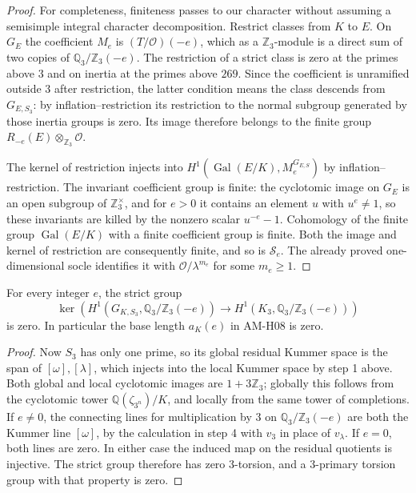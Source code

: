 \begin{proof}
For completeness, finiteness passes to our character without
assuming a semisimple integral character decomposition.  Restrict
classes from $K$ to $E$.  On $G_E$ the coefficient $M_e$ is
$(T/\mathcal O)(-e)$, which as a $\mathbb Z_3$-module is a direct
sum of two copies of $\mathbb Q_3/\mathbb Z_3(-e)$.
The restriction of a strict class is zero at the primes above $3$
and on inertia at the primes above $269$.  Since the coefficient
is unramified outside $3$ after restriction, the latter condition
means the class descends from $G_{E,S_3}$: by inflation--restriction
its restriction to the normal subgroup generated by those inertia
groups is zero.  Its image therefore belongs to the finite group
$R_{-e}(E)\otimes_{\mathbb Z_3}\mathcal O$.

The kernel of restriction injects into
$H^1(\operatorname{Gal}(E/K),M_e^{G_{E,S}})$ by
inflation--restriction.  The invariant coefficient group is finite:
the cyclotomic image on $G_E$ is an open subgroup of
$\mathbb Z_3^{\times}$, and for $e>0$ it contains an element
$u$ with $u^e\ne1$, so these invariants are killed by the nonzero
scalar $u^{-e}-1$.  Cohomology of the finite group
$\operatorname{Gal}(E/K)$ with a finite coefficient group is finite.
Both the image and kernel of restriction are consequently finite,
and so is $\mathcal S_e$.  The already proved one-dimensional
socle identifies it with $\mathcal O/\lambda^{m_e}$ for some
$m_e\geq1$.
\end{proof}

\begin{corollary}
\label{AC-G22-base}
For every integer $e$, the strict group
\[
 \ker\left(H^1(G_{K,S_3},\mathbb Q_3/\mathbb Z_3(-e))
       \longrightarrow H^1(K_3,\mathbb Q_3/\mathbb Z_3(-e))\right)
\]
is zero.  In particular the base length $a_K(e)$ in AM-H08 is zero.
\end{corollary}
\begin{proof}
Now $S_3$ has only one prime, so its global residual Kummer space
is the span of $[\omega],[\lambda]$, which injects into the local
Kummer space by step 1 above.  Both global and local cyclotomic
images are $1+3\mathbb Z_3$; globally this follows from the
cyclotomic tower $\mathbb Q(\zeta_{3^n})/K$, and locally from
the same tower of completions.  If $e\ne0$, the connecting lines
for multiplication by $3$ on $\mathbb Q_3/\mathbb Z_3(-e)$ are
both the Kummer line $[\omega]$, by the calculation in step 4
with $v_3$ in place of $v_\lambda$.  If $e=0$, both lines are
zero.  In either case the induced map on the residual quotients
is injective.  The strict group therefore has zero $3$-torsion,
and a $3$-primary torsion group with that property is zero.
\end{proof}


